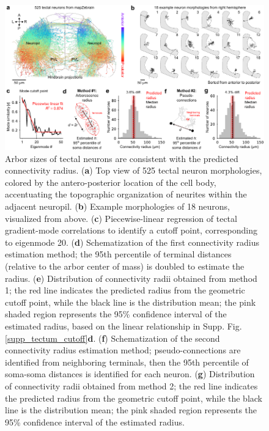 \documentclass{article}
\begin{document}
\begin{figure}[t]
    \centering
    \includegraphics[width=0.95\linewidth]{figures/figure7.pdf}
    \caption{Arbor sizes of tectal neurons are consistent with the predicted connectivity radius. (\textbf{a}) Top view of 525 tectal neuron morphologies, colored by the antero-posterior location of the cell body, accentuating the topographic organization of neurites within the adjacent neuropil. (\textbf{b}) Example morphologies of 18 neurons, visualized from above. (\textbf{c}) Piecewise-linear regression of tectal gradient-mode correlations to identify a cutoff point, corresponding to eigenmode 20. (\textbf{d}) Schematization of the first connectivity radius estimation method; the 95th percentile of terminal distances (relative to the arbor center of mass) is doubled to estimate the radius. (\textbf{e}) Distribution of connectivity radii obtained from method 1; the red line indicates the predicted radius from the geometric cutoff point, while the black line is the distribution mean; the pink shaded region represents the 95\% confidence interval of the estimated radius, based on the linear relationship in Supp. Fig. \ref{supp_tectum_cutoff}\textbf{d}. (\textbf{f}) Schematization of the second connectivity radius estimation method; pseudo-connections are identified from neighboring terminals, then the 95th percentile of soma-soma distances is identified for each neuron. (\textbf{g}) Distribution of connectivity radii obtained from method 2; the red line indicates the predicted radius from the geometric cutoff point, while the black line is the distribution mean; the pink shaded region represents the 95\% confidence interval of the estimated radius.}
    \label{fig7}
    \hrulefill
\end{figure}
\end{document}
